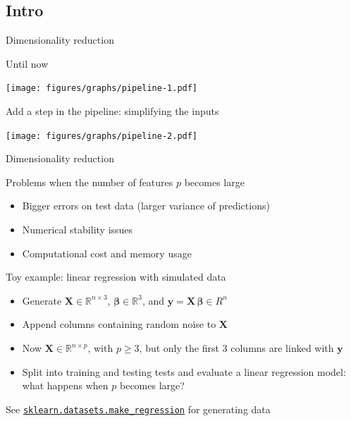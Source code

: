 \documentclass[presentation,mathserif,table]{beamer}
\newcommand{\X}{{\mathbold X}}
\newcommand{\bbeta}{{\mathbold \beta}}
\newcommand{\y}{{\mathbold y}}
\newcommand{\R}{\mathbb{R}}
\begin{document}
\subsection{Intro}
\label{sec:orgda6fcca}
\begin{frame}[label={sec:org17e244a}]{Dimensionality reduction}
\begin{block}{Until now}
\begin{center}
\texttt{[image: figures/graphs/pipeline-1.pdf]}
\end{center}
\end{block}
\begin{block}{Add a step in the pipeline: simplifying the inputs}
\begin{center}
\texttt{[image: figures/graphs/pipeline-2.pdf]}
\end{center}
\end{block}
\end{frame}
\begin{frame}[label={sec:org67d49d0}]{Dimensionality reduction}
\begin{block}{Problems when the number of features \(p\) becomes large}
\begin{itemize}
\item Bigger errors on test data (larger variance of predictions)
\item Numerical stability issues
\item Computational cost and memory usage
\end{itemize}
\end{block}
\end{frame}
\begin{frame}[label={sec:org2ba1cce},fragile]{Toy example: linear regression with simulated data}
 \begin{itemize}
\item Generate \(\X \in \R^{n \times 3}\), \(\mathbold{\bbeta} \in \R^3\), and \(\y = \X \, \bbeta \in R^n\)
\item Append columns containing random noise to \(\X\)
\item Now \(\X \in \R^{n \times p}\), with \(p \geq 3\), but only the first 3 columns are linked with \(\y\)
\item Split into training and testing tests and evaluate a linear regression model: what happens when \(p\) becomes large?
\end{itemize}
\vfill

See \href{https://scikit-learn.org/stable/modules/generated/sklearn.datasets.make\_regression.html\#sklearn.datasets.make\_regression}{\texttt{sklearn.datasets.make\_regression}} for generating data
\end{frame}
\end{document}
